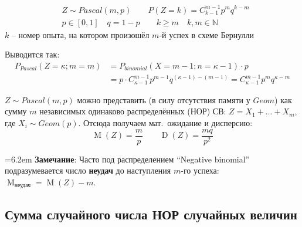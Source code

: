 \documentclass[a4paper,12pt,fleqn]{article}
\newenvironment{onsamepage} {\begin{minipage}{\textwidth}} {\end{minipage}}
\numberwithin{figure}{section}
\theoremstyle{definition}
\let\geqs\geqslant
\def\N{\mathbb{N}}
\DeclareMathOperator{\M}{M}
\DeclareMathOperator{\D}{D}
\begin{document}
\begin{onsamepage}
\begin{align*}
&	Z \sim Pascal(m,p) \qquad P(Z=k)=C_{k-1}^{m-1} p^m q^{k-m} \\
&	p\in[0,1] \quad q=1-p  \qquad  k \geqs m \quad k,m\in\N
\end{align*}
$k$ -- номер опыта, на котором произошёл $m$-й успех в схеме Бернулли

\medskip
\def\kh{\kappa}
\def\mh{m}
Выводится так:
\begin{align*}
P_{Pascal}(Z=\kh;m=\mh) &= P_{binomial}(X=\mh-1; n=\kh-1) \cdot p		\\
						&= p \cdot C_{\kh-1}^{\mh-1} p^{\mh-1} q^{(\kh-1)-(\mh-1)}
						= C_{\kh-1}^{\mh-1} p^{\mh} q^{\kh-\mh}
\end{align*}
\end{onsamepage}

$Z \sim Pascal(m,p)$ можно представить (в силу отсутствия памяти у $Geom$)
как сумму $m$ независимых одинаково распределённых (НОР) СВ:
		$Z=X_1+...+X_m$, где $X_i \sim Geom(p)$.
Отсюда получаем \mbox{мат. ожидание} и дисперсию:  %
\[	\M(Z) = \frac{m}{p}	\qquad	\D(Z) = \frac{m q}{p^2} \]

\hangindent=6.2em 
\textbf{Замечание}: Часто под распределением ``Negative binomial''
подразумевается число \textbf{неудач} до наступления $m$-го успеха:
$\M_\text{неудач} = \M(Z)-m$.


\subsection{Сумма случайного числа НОР случайных величин}
\end{document}
